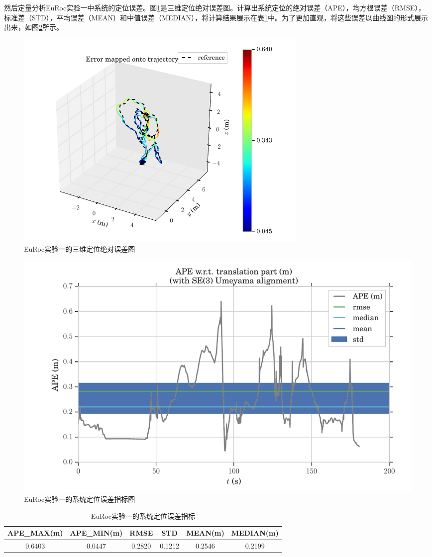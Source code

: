 然后定量分析EuRoc实验一中系统的定位误差。图\ref{fig5_6}是三维定位绝对误差图。计算出系统定位的绝对误差（APE），均方根误差（RMSE），标准差（STD），平均误差（MEAN）和中值误差（MEDIAN），将计算结果展示在表\ref{tab:5.1}中。为了更加直观，将这些误差以曲线图的形式展示出来，如图\ref{fig5_7}所示。
\begin{figure}[!h]
	\centering
	\includegraphics[width=0.7\textwidth]{figures/chapter5/ape_map_mh01}
	\caption{EuRoc实验一的三维定位绝对误差图}\label{fig5_6}
\end{figure}
\begin{figure}
	\centering
	\includegraphics[width=1.0\textwidth]{figures/chapter5/ape_err_mh01}
	\caption{EuRoc实验一的系统定位误差指标图}\label{fig5_7}
\end{figure}
\begin{table}[!h]
	\centering
	\caption{EuRoc实验一的系统定位误差指标} \label{tab:5.1}
	\begin{tabular*}{0.9\textwidth}{@{\extracolsep{\fill}}cccccc}
		\toprule
		APE\_MAX(m)&APE\_MIN(m) &RMSE	&STD	&MEAN(m)	&MEDIAN(m) \\
		\midrule
		0.6403	&0.0447	&0.2820	&0.1212	&0.2546	&0.2199\\
		\bottomrule
	\end{tabular*}
\end{table}


